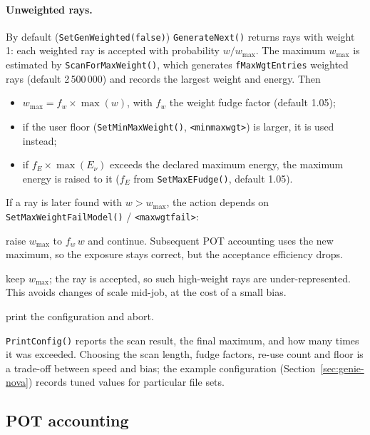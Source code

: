 \documentclass[11pt]{article}
\newcommand{\code}[1]{\texttt{#1}}
\newcommand{\sect}[1]{Section~\ref{sec:#1}}
\begin{document}
\paragraph{Unweighted rays.}  By default (\code{SetGenWeighted(false)})
\code{GenerateNext()} returns rays with weight 1: each weighted ray is
accepted with probability $w/w_\mathrm{max}$.  The maximum
$w_\mathrm{max}$ is estimated by \code{ScanForMaxWeight()}, which generates
\code{fMaxWgtEntries} weighted rays (default 2\,500\,000) and records the
largest weight and energy.  Then
\begin{itemize}[nosep]
\item $w_\mathrm{max} = f_w\times\max(w)$, with $f_w$ the weight fudge
      factor (default 1.05);
\item if the user floor (\code{SetMinMaxWeight()}, \code{<minmaxwgt>}) is
      larger, it is used instead;
\item if $f_E\times\max(E_\nu)$ exceeds the declared maximum energy, the
      maximum energy is raised to it ($f_E$ from \code{SetMaxEFudge()},
      default 1.05).
\end{itemize}
If a ray is later found with $w > w_\mathrm{max}$, the action depends on
\code{SetMaxWeightFailModel()} / \code{<maxwgtfail>}:
\begin{description}[nosep,font=\ttfamily]
\item[bump (0, default)] raise $w_\mathrm{max}$ to $f_w\,w$ and continue.
      Subsequent POT accounting uses the new maximum, so the exposure stays
      correct, but the acceptance efficiency drops.
\item[frozen (1)] keep $w_\mathrm{max}$; the ray is accepted, so such
      high-weight rays are under-represented.  This avoids changes of scale
      mid-job, at the cost of a small bias.
\item[abort (2)] print the configuration and abort.
\end{description}
\code{PrintConfig()} reports the scan result, the final maximum, and how
many times it was exceeded.  Choosing the scan length, fudge factors,
re-use count and floor is a trade-off between speed and bias; the example
configuration (\sect{genie-nova}) records tuned values for particular
file sets.

\subsection{POT accounting}\label{sec:genie-pot}
\end{document}
